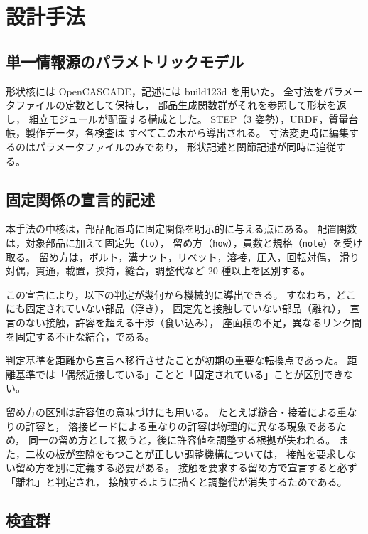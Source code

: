 \documentclass[a4paper,10pt,twocolumn]{ltjsarticle}
\newcommand{\code}[1]{\texttt{\footnotesize #1}}
\begin{document}
\section{設計手法}

\subsection{単一情報源のパラメトリックモデル}

形状核には OpenCASCADE\cite{occt}，記述には build123d\cite{build123d} を用いた。
全寸法をパラメータファイルの定数として保持し，
部品生成関数群がそれを参照して形状を返し，
組立モジュールが配置する構成とした。
STEP（3 姿勢），URDF，質量台帳，製作データ，各検査は
すべてこの木から導出される。
寸法変更時に編集するのはパラメータファイルのみであり，
形状記述と関節記述が同時に追従する。

\subsection{固定関係の宣言的記述}

本手法の中核は，部品配置時に固定関係を明示的に与える点にある。
配置関数は，対象部品に加えて固定先（\code{to}），
留め方（\code{how}），員数と規格（\code{note}）を受け取る。
留め方は，ボルト，溝ナット，リベット，溶接，圧入，回転対偶，
滑り対偶，貫通，載置，挟持，縫合，調整代など 20 種以上を区別する。

この宣言により，以下の判定が幾何から機械的に導出できる。
すなわち，どこにも固定されていない部品（浮き），
固定先と接触していない部品（離れ），
宣言のない接触，許容を超える干渉（食い込み），
座面積の不足，異なるリンク間を固定する不正な結合，である。

判定基準を距離から宣言へ移行させたことが初期の重要な転換点であった。
距離基準では「偶然近接している」ことと「固定されている」ことが区別できない。

留め方の区別は許容値の意味づけにも用いる。
たとえば縫合・接着による重なりの許容と，
溶接ビードによる重なりの許容は物理的に異なる現象であるため，
同一の留め方として扱うと，後に許容値を調整する根拠が失われる。
また，二枚の板が空隙をもつことが正しい調整機構については，
接触を要求しない留め方を別に定義する必要がある。
接触を要求する留め方で宣言すると必ず「離れ」と判定され，
接触するように描くと調整代が消失するためである。

\subsection{検査群}
\end{document}
